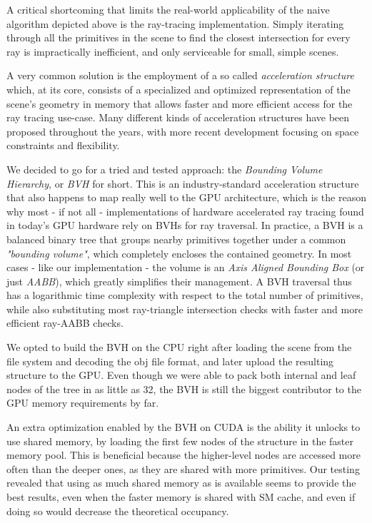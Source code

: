 \documentclass[12pt,a4paper]{article}
\begin{document}
A critical shortcoming that limits the real-world applicability of the naive algorithm depicted above is the ray-tracing implementation. Simply iterating through all the primitives in the scene to find the closest intersection for every ray is impractically inefficient, and only serviceable for small, simple scenes.

A very common solution is the employment of a so called \textit{acceleration structure} which, at its core, consists of a specialized and optimized representation of the scene's geometry in memory that allows faster and more efficient access for the ray tracing use-case. Many different kinds of acceleration structures have been proposed throughout the years, with more recent development focusing on space constraints and flexibility.

We decided to go for a tried and tested approach: the \textit{Bounding Volume Hierarchy}, or \textit{BVH} for short. This is an industry-standard acceleration structure that also happens to map really well to the GPU architecture, which is the reason why most - if not all - implementations of hardware accelerated ray tracing found in today's GPU hardware rely on BVHs for ray traversal. In practice, a BVH is a balanced binary tree that groups nearby primitives together under a common \textit{"bounding volume"}, which completely encloses the contained geometry. In most cases - like our implementation - the volume is an \textit{Axis Aligned Bounding Box} (or just \textit{AABB}), which greatly simplifies their management. A BVH traversal thus has a logarithmic time complexity with respect to the total number of primitives, while also substituting most ray-triangle intersection checks with faster and more efficient ray-AABB checks.

We opted to build the BVH on the CPU right after loading the scene from the file system and decoding the obj file format, and later upload the resulting structure to the GPU. Even though we were able to pack both internal and leaf nodes of the tree in as little as \qty{32}{\byte}, the BVH is still the biggest contributor to the GPU memory requirements by far.

An extra optimization enabled by the BVH on CUDA is the ability it unlocks to use shared memory, by loading the first few nodes of the structure in the faster memory pool. This is beneficial because the higher-level nodes are accessed more often than the deeper ones, as they are shared with more primitives. Our testing revealed that using as much shared memory as is available seems to provide the best results, even when the faster memory is shared with SM cache, and even if doing so would decrease the theoretical occupancy.
\end{document}
